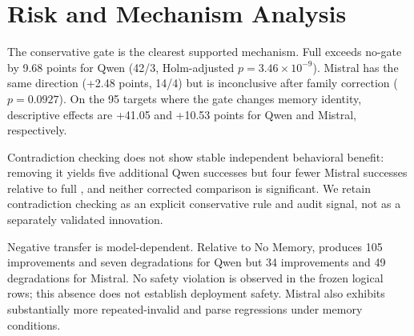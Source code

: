 \section{Risk and Mechanism Analysis}




The conservative gate is the clearest supported mechanism. Full \proper{} exceeds no-gate by 9.68 points for Qwen (42/3, Holm-adjusted $p=3.46\times10^{-9}$). Mistral has the same direction (+2.48 points, 14/4) but is inconclusive after family correction ($p=0.0927$). On the 95 targets where the gate changes memory identity, descriptive effects are +41.05 and +10.53 points for Qwen and Mistral, respectively.

Contradiction checking does not show stable independent behavioral benefit: removing it yields five additional Qwen successes but four fewer Mistral successes relative to full \proper, and neither corrected comparison is significant. We retain contradiction checking as an explicit conservative rule and audit signal, not as a separately validated innovation.

Negative transfer is model-dependent. Relative to No Memory, \proper{} produces 105 improvements and seven degradations for Qwen but 34 improvements and 49 degradations for Mistral. No safety violation is observed in the frozen logical rows; this absence does not establish deployment safety. Mistral also exhibits substantially more repeated-invalid and parse regressions under memory conditions.
